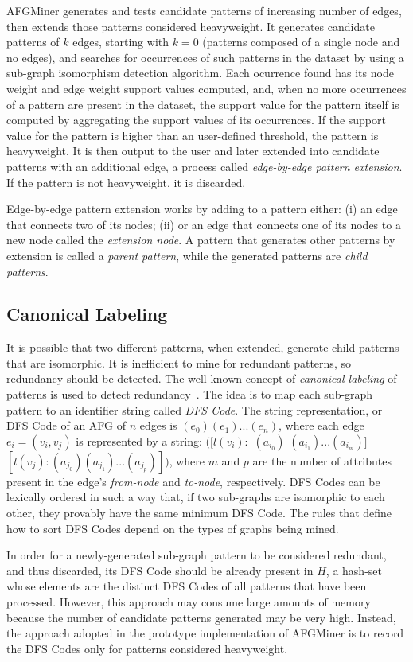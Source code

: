 AFGMiner generates and tests candidate patterns of increasing number of edges, then extends those patterns considered heavyweight. It generates candidate patterns of $k$ edges, starting with $k = 0$ (patterns composed of a single node and no edges), and searches for occurrences of such patterns in the dataset by using a sub-graph isomorphism detection algorithm. Each ocurrence found has its node weight and edge weight support values computed, and, when no more occurrences of a pattern are present in the dataset, the support value for the pattern itself is computed by aggregating the support values of its occurrences. If the support value for the pattern is higher than an user-defined threshold, the pattern is heavyweight. It is then output to the user and later extended into candidate patterns with an additional edge, a process called \emph{edge-by-edge pattern extension}. If the pattern is not heavyweight, it is discarded. 

Edge-by-edge pattern extension works by adding to a pattern either: (i) an edge that connects two of its nodes; (ii) or an edge that connects one of its nodes to a new node called the \emph{extension node}. A pattern that generates other patterns by extension is called a \emph{parent pattern}, while the generated patterns are \emph{child patterns}.

\subsection{Canonical Labeling}
It is possible that two different patterns, when extended, generate child patterns that are isomorphic. It is inefficient to mine for redundant patterns, so redundancy should be detected. The well-known concept of \emph{canonical labeling} of patterns is used to detect redundancy~\cite{gSpan}. The idea is to map each sub-graph pattern to an identifier string called \emph{DFS Code}. The string representation, or DFS Code of an AFG of $n$ edges is $(e_0) (e_1)...(e_n)$, where each edge $e_i=(v_i, v_j)$ is represented by a string: $( [l(v_i):$ $(a_{i_0})$ $(a_{i_1})...(a_{i_m})]$ $[l(v_j): (a_{j_0}) (a_{j_1})...(a_{j_p})] )$, where $m$ and $p$ are the number of attributes present in the edge's \emph{from-node} and \emph{to-node}, respectively. DFS Codes can be lexically ordered in such a way that, if two sub-graphs are isomorphic to each other, they provably have the same minimum DFS Code. The rules that define how to sort DFS Codes depend on the types of graphs being mined. 

In order for a newly-generated sub-graph pattern to be considered redundant, and thus discarded, its DFS Code should be already present in $H$, a hash-set whose elements are the distinct DFS Codes of all patterns that have been processed. However, this approach may consume large amounts of memory because the number of candidate patterns generated may be very high. Instead, the approach adopted in the prototype implementation of AFGMiner is to record the DFS Codes only for patterns considered heavyweight. 

